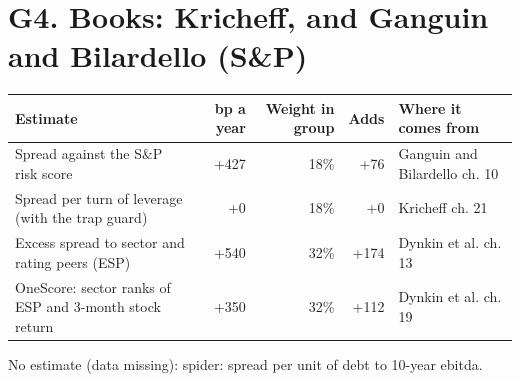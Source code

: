 \documentclass[11pt,a4paper]{article}
\begin{document}
\section*{G4. Books: Kricheff, and Ganguin and Bilardello (S\&P)}
\par\noindent{}
\begin{center}\footnotesize\setlength{\tabcolsep}{3.5pt}\begin{tabular}{@{}p{6.2cm}rrrp{4.2cm}@{}}\toprule
Estimate & bp a year & Weight in group & Adds & Where it comes from \\\midrule
Spread against the S\&P risk score & +427 & 18\% & +76 & Ganguin and Bilardello ch. 10 \\
Spread per turn of leverage (with the trap guard) & +0 & 18\% & +0 & Kricheff ch. 21 \\
Excess spread to sector and rating peers (ESP) & +540 & 32\% & +174 & Dynkin et al. ch. 13 \\
OneScore: sector ranks of ESP and 3-month stock return & +350 & 32\% & +112 & Dynkin et al. ch. 19 \\
\bottomrule\end{tabular}\end{center}
No estimate (data missing): spider: spread per unit of debt to 10-year ebitda.
\end{document}
